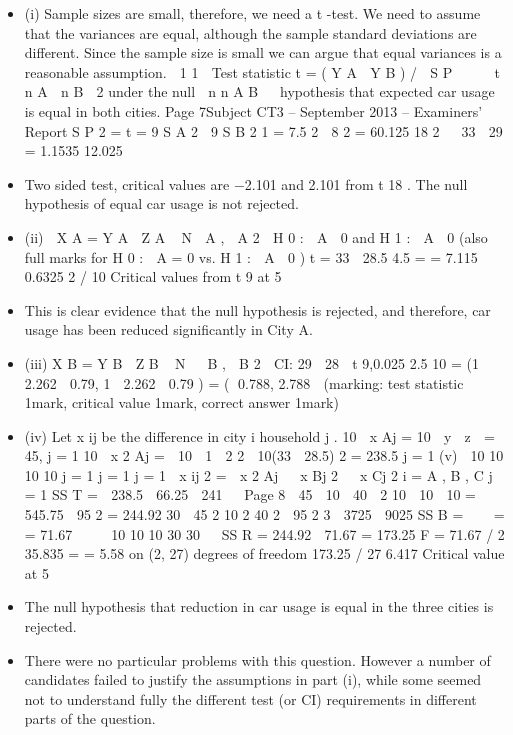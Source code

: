\documentclass[a4paper,12pt]{article}
\begin{document}
\begin{itemize}
\item(i)
Sample sizes are small, therefore, we need a t -test. We need to assume that
the variances are equal, although the sample standard deviations are different.
Since the sample size is small we can argue that equal variances is a
reasonable assumption.

1
1 
Test statistic t  =  ( Y A  Y B ) /  S P

  ~ t n A  n B  2 under the null

n
n
A
B 

hypothesis that expected car usage is equal in both cities.
Page 7Subject CT3 – September 2013 – Examiners’ Report
S P 2  = 
t  = 
9 S A 2  9 S B 2 1
 =  7.5 2  8 2  =  60.125
18
2


33  29
 =  1.1535
12.025
\item Two sided test, critical values are −2.101 and 2.101 from t 18 .
The null hypothesis of equal car usage is not rejected.
\item (ii)

X A  =  Y A  Z A ~ N  A ,  A 2

H 0 :  A  0 and H 1 :  A  0 (also full marks for H 0 :  A  =  0 vs. H 1 :  A  0 )
t  = 
33  28.5
4.5
 = 
 =  7.115
0.6325
2 / 10
Critical values from t 9 at 5%
\item This is clear evidence that the null hypothesis is rejected, and therefore, car
usage has been reduced significantly in City A.
\item (iii)
X B  =  Y B  Z B ~ N   B ,  B 2 
CI: 29  28 
t 9,0.025 2.5
10
 =  (1  2.262  0.79, 1  2.262  0.79 )  =  ( 0.788, 2.788 
(marking: test statistic 1mark, critical value 1mark, correct answer 1mark)
\item (iv)
Let x ij be the difference in city i household j .
10
 x Aj  =  10  y  z   =  45,
j  =  1
10
 x 2 Aj  =   10  1  2 2  10(33  28.5) 2  =  238.5
j  =  1
(v)

10
10 10 10
j  =  1 j  =  1 j  =  1
 x ij 2  =   x 2 Aj   x Bj 2   x Cj 2
i  =  A , B , C j  =  1
SS T  =   238.5  66.25  241  
Page 8
 45  10  40  2
10  10  10
 =  545.75 
95 2
 =  244.92
30
 45 2 10 2 40 2  95 2 3  3725  9025
SS B  =  


 = 
 =  71.67
  
 10 10
10
30
30


SS R  =  244.92  71.67  =  173.25
F  = 
71.67 / 2
35.835
 = 
 =  5.58 on (2, 27) degrees of freedom
173.25 / 27 6.417
Critical value at 5%
\item The null hypothesis that reduction in car usage is equal in the three cities is
rejected.
\item There were no particular problems with this question. However a number of candidates
failed to justify the assumptions in part (i), while some seemed not to understand fully the
different test (or CI) requirements in different parts of the question.
\end{itemize}
\end{document}
